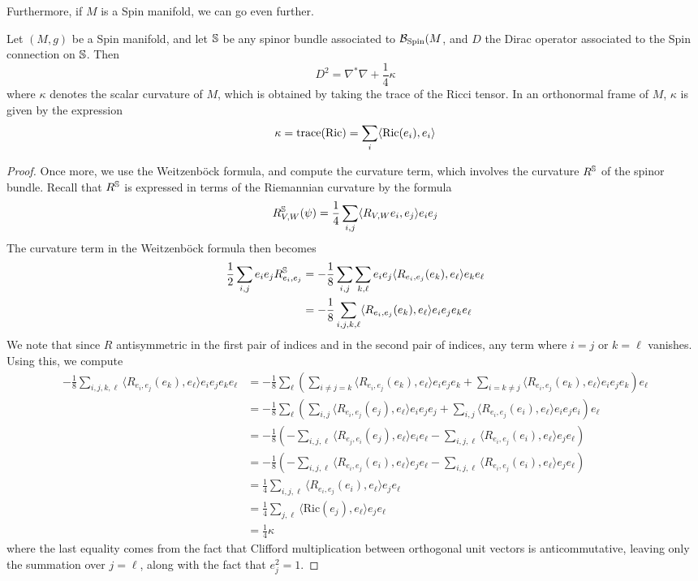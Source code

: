 Furthermore, if $M$ is a Spin manifold, we can go even further.
%
\begin{thm}[\ib{Lichnerowicz}]
Let $(M,g)$ be a Spin manifold, and let $\S$ be any spinor bundle associated to
$\B_{\Spin}(M$, and $D$ the Dirac operator associated to the Spin connection on $\S$.
Then
\[
D^2 = \nabla^*\nabla + \frac{1}{4}\kappa
\]
where $\kappa$ denotes the scalar curvature of $M$, which is obtained by taking
the trace of the Ricci tensor. In an orthonormal frame of $M$, $\kappa$ is given by
the expression
\[
\kappa = \trace(\mathrm{Ric}) = \sum_{i} \langle \mathrm{Ric}(e_i), e_i \rangle
\]
\end{thm}
%
\begin{proof} %
Once more, we use the Weitzenb\"ock formula, and compute the curvature term, which
involves the curvature $R^\S$ of the spinor bundle. Recall that $R^\S$ is expressed
in terms of the Riemannian curvature by the formula
\[
R^\S_{V,W}(\psi) = \frac{1}{4}\sum_{i, j}\langle R_{V,W}e_i, e_j \rangle e_ie_j
\]
The curvature term in the Weitzenb\"ock formula then becomes
\begin{align*}
\frac{1}{2}\sum_{i,j}e_ie_jR^\S_{e_i,e_j}
&= -\frac{1}{8}\sum_{i,j}\sum_{k,\ell}e_ie_j\langle R_{e_i, e_j}(e_k), e_\ell \rangle
e_ke_\ell \\
&= -\frac{1}{8}\sum_{i,j,k,\ell} \langle R_{e_i, e_j}(e_k), e_\ell \rangle
e_ie_je_ke_\ell
\end{align*}
We note that since $R$ antisymmetric in the first pair of indices and in the
second pair of indices, any term where $i = j$ or $k = \ell$ vanishes.
Using this, we compute
\begin{align*}
-\frac{1}{8}\sum_{i,j,k,\ell} \langle R_{e_i, e_j}(e_k), e_\ell \rangle e_ie_je_ke_\ell
&= -\frac{1}{8} \sum_\ell \left( \sum_{i \neq j = k}
\langle R_{e_i, e_j}(e_k), e_\ell \rangle e_ie_je_k + \sum_{i = k \neq j}  \langle
R_{e_i, e_j}(e_k), e_\ell \rangle e_ie_je_k\right)e_\ell \\
&= -\frac{1}{8}\sum_\ell \left( \sum_{i,j} \langle R_{e_i, e_j}(e_j), e_\ell \rangle
e_ie_je_j + \sum_{i,j} \langle R_{e_i, e_j}(e_i), e_\ell \rangle e_ie_je_i\right)
e_\ell \\
&= -\frac{1}{8} \left(-\sum_{i,j,\ell} \langle R_{e_j,e_i}(e_j), e_\ell \rangle
e_ie_\ell - \sum_{i,j,\ell} \langle R_{e_i, e_j}(e_i), e_\ell \rangle e_je_\ell\right) \\
&= -\frac{1}{8} \left(-\sum_{i,j,\ell} \langle R_{e_i,e_j}(e_i), e_\ell \rangle
e_je_\ell - \sum_{i,j,\ell} \langle R_{e_i, e_j}(e_i), e_\ell \rangle e_je_\ell\right) \\
&= \frac{1}{4} \sum_{i,j,\ell} \langle R_{e_i, e_j}(e_i), e_\ell \rangle e_je_\ell \\
&= \frac{1}{4} \sum_{j, \ell} \langle \mathrm{Ric}(e_j), e_\ell \rangle e_je_\ell \\
&= \frac{1}{4} \kappa
\end{align*}
where the last equality comes from the fact that Clifford multiplication between
orthogonal unit vectors is anticommutative, leaving only the summation over $j = \ell$,
along with the fact that $e_j^2 = 1$.
\end{proof}
